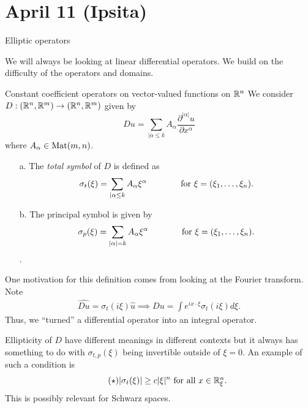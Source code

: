 \section*{\textbf{April 11 (Ipsita)}}
\begin{clear}{Elliptic operators}
  
We will always be looking at linear differential operators. We build on the difficulty of the operators and domains.

\begin{clear}{Constant coefficient operators on vector-valued functions on $\mathbb{R}^n$}
We consider $D: (\mathbb{R}^n, \mathbb{R}^m) \to (\mathbb{R}^n, \mathbb{R}^m) $ given by
$$Du = \sum\limits_{|\alpha \leq k} A_\alpha \frac{\partial^{|\alpha|} u }{\partial x^\alpha}$$ where $A_\alpha \in \mathrm{Mat} (m,n)$.

 \begin{defn} 
 \begin{enumerate}
 \item[a.]
 The {\it total symbol} of $D$ is defined as $$\sigma_t(\xi) = \sum\limits_{|\alpha \leq k} A_\alpha \xi^\alpha \hspace{0.5in} \mbox{   for $\xi = (\xi_1, \dots, \xi_n)$.} $$ %
 \item[b.]
 The principal symbol is given by $$\sigma_p (\xi) = \sum_{|\alpha| = k} A_\alpha \xi^\alpha \hspace{0.5in} \mbox{   for $\xi = (\xi_1, \dots, \xi_n)$.}$$.
 \end{enumerate}
\end{defn}


One motivation for this definition comes from looking at the Fourier transform.
Note 
\begin{align*}
\widehat{Du} = \sigma_t (i \xi) \hat{u} \implies Du = \int e^{ix \cdot \xi} \sigma_t(i \xi) d\xi.
\end{align*}
Thus, we ``turned'' a differential operator into an integral operator.

Ellipticity of $D$ have different meanings in different contexts but it always has something to do with $\sigma_{t,p} (\xi)$ being invertible outside of $\xi = 0$. An example of such a condition is
\begin{align*} \label{cond:star} \tag{$\star$}
|\sigma_t(\xi)| \geq c|\xi|^n \mbox{ for all $x \in \mathbb{R}^n_{\xi}$}.
\end{align*}
This is possibly relevant for Schwarz spaces.


\end{clear}
\end{clear}
